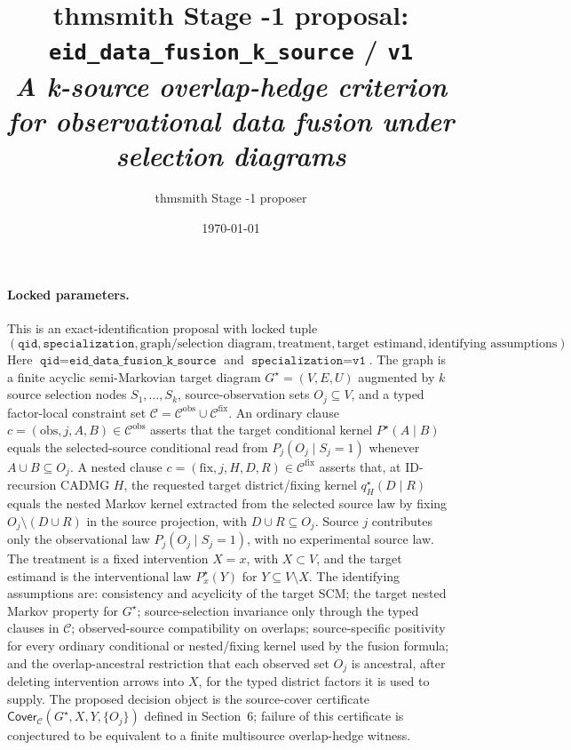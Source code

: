 \documentclass[11pt]{article}
\title{thmsmith Stage -1 proposal: \texttt{eid\_data\_fusion\_k\_source} / \texttt{v1}%
  \\ \large\textit{A k-source overlap-hedge criterion for observational data fusion under selection diagrams}}
\author{thmsmith Stage -1 proposer}
\date{\today}
\theoremstyle{definition}
\theoremstyle{plain}
\theoremstyle{remark}
\begin{document}
\maketitle


\paragraph{Locked parameters.}
This is an exact-identification proposal with locked tuple
\[
(\texttt{qid},\texttt{specialization},\text{graph/selection diagram},
\text{treatment},\text{target estimand},\text{identifying assumptions}).
\]
Here \(\texttt{qid}=\texttt{eid\_data\_fusion\_k\_source}\) and
\(\texttt{specialization}=\texttt{v1}\).  The graph is a finite acyclic
semi-Markovian target diagram \(G^\star=(V,E,U)\) augmented by \(k\) source
selection nodes \(S_1,\ldots,S_k\), source-observation sets
\(O_j\subseteq V\), and a typed factor-local constraint set
\(\mathcal C=\mathcal C^{\mathrm{obs}}\cup\mathcal C^{\mathrm{fix}}\).
An ordinary clause \(c=(\mathrm{obs},j,A,B)\in\mathcal C^{\mathrm{obs}}\)
asserts that the target conditional kernel \(P^\star(A\mid B)\) equals the
selected-source conditional read from \(P_j(O_j\mid S_j=1)\) whenever
\(A\cup B\subseteq O_j\).  A nested clause
\(c=(\mathrm{fix},j,H,D,R)\in\mathcal C^{\mathrm{fix}}\) asserts that, at
ID-recursion CADMG \(H\), the requested target district/fixing kernel
\(q^\star_H(D\mid R)\) equals the nested Markov kernel extracted from the
selected source law by fixing \(O_j\setminus(D\cup R)\) in the source
projection, with \(D\cup R\subseteq O_j\).  Source \(j\) contributes only the observational law
\(P_j(O_j\mid S_j=1)\), with no experimental source law.  The treatment is a
fixed intervention \(X=x\), with \(X\subset V\), and the target estimand is
the interventional law \(P^\star_x(Y)\) for \(Y\subseteq V\setminus X\).
The identifying assumptions are: consistency and acyclicity of the target
SCM; the target nested Markov property for \(G^\star\); source-selection
invariance only through the typed clauses in \(\mathcal C\);
observed-source compatibility on overlaps; source-specific positivity for
every ordinary conditional or nested/fixing kernel used by the fusion
formula; and the overlap-ancestral restriction that each observed set
\(O_j\) is ancestral, after deleting intervention arrows into \(X\), for the
typed district factors it is used to supply.  The proposed decision object is the
source-cover certificate \(\mathsf{Cover}_{\mathcal C}(G^\star,X,Y,\{O_j\})\)
defined in Section~6; failure of this certificate is conjectured to be
equivalent to a finite multisource overlap-hedge witness.
\end{document}
